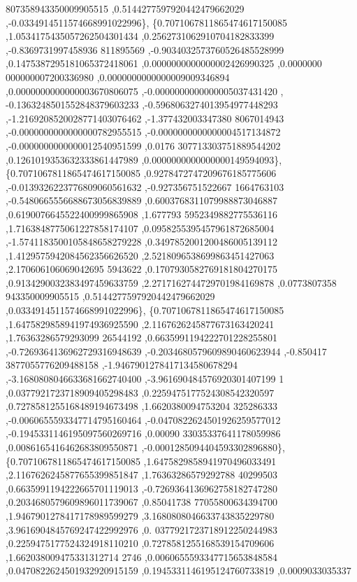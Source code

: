 \begin{DoxyCode}
      807358943350009905515 ,0.5144277597920442479662029 ,-0.0334914511574668991022996\},
\{0.7071067811865474617150085 ,1.0534175435057262504301434 ,0.2562731062910704182833399 ,-0.8369731997458936
      811895569 ,-0.9034032573760526485528999 ,0.1475387295181065372418061 ,0.0000000000000002426990325 ,0.0000000
      000000007200336980 ,0.0000000000000009009346894 ,0.0000000000000003670806075 ,-0.0000000000000005037431420 ,
      -0.1363248501552848379603233 ,-0.5968063274013954977448293 ,-1.2169208520028771403076462 ,-1.377432003347380
      8067014943 ,-0.0000000000000000782955515 ,-0.0000000000000004517134872 ,-0.0000000000000012540951599 ,0.0176
      307713303751889544202 ,0.1261019353632333861447989 ,0.0000000000000000149594093\},
\{0.7071067811865474617150085 ,0.9278472747209676185775606 ,-0.0139326223776809060561632 ,-0.927356751522667
      1664763103 ,-0.5480665556688673056839889 ,0.6003768311079988873046887 ,0.6190076645522400999865908 ,1.677793
      5952349882775536116 ,1.7163848775061227858174107 ,0.0958255395457961872685004 ,-1.5741183500105848658279228 
      ,0.3497852001200486005139112 ,1.4129575942084562356626520 ,2.5218096538699863451427063 ,2.170606106069042695
      5943622 ,0.1707930582769181804270175 ,0.9134290032383497459633759 ,2.2717162744729701984169878 ,0.0773807358
      943350009905515 ,0.5144277597920442479662029 ,0.0334914511574668991022996\},
\{0.7071067811865474617150085 ,1.6475829858941974936925590 ,2.1167626245877673163420241 ,1.76363286579293099
      26544192 ,0.6635991194222701228255801 ,-0.7269364136962729316948639 ,-0.2034680579609890460623944 ,-0.850417
      3877055776209488158 ,-1.9467901278417134580678294 ,-3.1680808046633681662740400 ,-3.961690484576920301407199
      1 ,0.0377921723718909405298483 ,0.2259475177524308542320597 ,0.7278581255168489194673498 ,1.6620380094753204
      325286333 ,-0.0060655593347714795160464 ,-0.0470822624501926259577012 ,-0.1945331146195097560269716 ,0.00090
      33035337641178059986 ,0.0086165416462683809550871 ,-0.0001285094404593302896880\},
\{0.7071067811865474617150085 ,1.6475829858941970496033491 ,2.1167626245877655399851847 ,1.76363286579292788
      40299503 ,0.6635991194222665701119013 ,-0.7269364136962758182747280 ,0.2034680579609896011739067 ,0.85041738
      77055800634394700 ,1.9467901278417178989599279 ,3.1680808046633743835229780 ,3.9616904845769247422992976 ,0.
      0377921723718912250244983 ,0.2259475177524324918110210 ,0.7278581255168539154709606 ,1.662038009475331312714
      2746 ,0.0060655593347715653848584 ,0.0470822624501932920915159 ,0.1945331146195124760733819 ,0.0009033035337

\end{DoxyCode}

